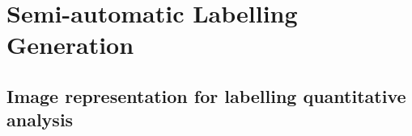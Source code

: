 \documentclass[runningheads,a4paper]{llncs}
\begin{document}




\section{Semi-automatic Labelling Generation}

\subsection{Image representation for labelling quantitative analysis}
\end{document}
